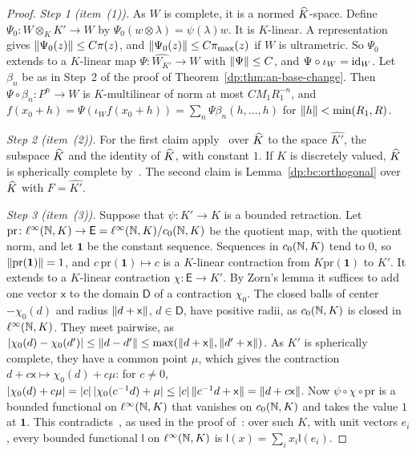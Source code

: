 \begin{proof}
\emph{Step 1 (item~(1)).} As $W$ is complete, it is a normed $\widehat K$-space. Define $\Psi_0\colon W\otimes_KK'\to W$ by $\Psi_0(w\otimes\lambda)=\psi(\lambda)w$. It is $K$-linear. A representation gives $\lVert \Psi_0(z)\rVert\le C\pi(z)$, and $\lVert \Psi_0(z)\rVert\le C\pi_{\max}(z)$ if $W$ is ultrametric. So $\Psi_0$ extends to a $K$-linear map $\Psi\colon\widehat{W_{K'}}\to W$ with $\lVert \Psi\rVert\le C$, and $\Psi\circ\iota_W=\mathrm{id}_W$. Let $\beta_n$ be as in Step~2 of the proof of Theorem~\ref{dp:thm:an-base-change}. Then $\Psi\circ\beta_n\colon P^n\to W$ is $K$-multilinear of norm at most $CM_1R_1^{-n}$, and $f(x_0+h)=\Psi(\iota_Wf(x_0+h))=\sum_n\Psi\beta_n(h,\dots,h)$ for $\lVert h\rVert<\min(R_1,R)$.

\emph{Step 2 (item~(2)).} For the first claim apply~\cite[Theorem~D.3]{I} over $\widehat K$ to the space $\widehat{K'}$, the subspace $\widehat K$ and the identity of $\widehat K$, with constant $1$. If $K$ is discretely valued, $\widehat K$ is spherically complete by~\cite[Lemma~D.1]{I}. The second claim is Lemma~\ref{dp:bc:orthogonal} over $\widehat K$ with $F=\widehat{K'}$.

\emph{Step 3 (item~(3)).} Suppose that $\psi\colon K'\to K$ is a bounded retraction. Let $\mathrm{pr}\colon\ell^\infty(\mathbb N,K)\to\mathsf E=\ell^\infty(\mathbb N,K)/c_0(\mathbb N,K)$ be the quotient map, with the quotient norm, and let $\mathbf 1$ be the constant sequence. Sequences in $c_0(\mathbb N,K)$ tend to $0$, so $\lVert \mathrm{pr}(\mathbf 1)\rVert=1$, and $c\,\mathrm{pr}(\mathbf 1)\mapsto c$ is a $K$-linear contraction from $K\mathrm{pr}(\mathbf 1)$ to $K'$. It extends to a $K$-linear contraction $\chi\colon\mathsf E\to K'$. By Zorn's lemma it suffices to add one vector $\mathsf x$ to the domain $\mathsf D$ of a contraction $\chi_0$. The closed balls of center $-\chi_0(d)$ and radius $\lVert d+\mathsf x\rVert$, $d\in\mathsf D$, have positive radii, as $c_0(\mathbb N,K)$ is closed in $\ell^\infty(\mathbb N,K)$. They meet pairwise, as $\lvert \chi_0(d)-\chi_0(d')\rvert\le\lVert d-d'\rVert\le\max(\lVert d+\mathsf x\rVert,\lVert d'+\mathsf x\rVert)$. As $K'$ is spherically complete, they have a common point $\mu$, which gives the contraction $d+c\mathsf x\mapsto\chi_0(d)+c\mu$: for $c\ne0$, $\lvert \chi_0(d)+c\mu\rvert=\lvert c\rvert\,\lvert \chi_0(c^{-1}d)+\mu\rvert\le\lvert c\rvert\,\lVert c^{-1}d+\mathsf x\rVert=\lVert d+c\mathsf x\rVert$. Now $\psi\circ\chi\circ\mathrm{pr}$ is a bounded functional on $\ell^\infty(\mathbb N,K)$ that vanishes on $c_0(\mathbb N,K)$ and takes the value $1$ at $\mathbf 1$. This contradicts~\cite[Th\'eor\`eme~4.1]{VdP}, as used in the proof of~\cite[Lemma~F.2]{I}: over such $K$, with unit vectors $e_i$, every bounded functional $\mathsf l$ on $\ell^\infty(\mathbb N,K)$ is $\mathsf l(x)=\sum_ix_i\mathsf l(e_i)$.
\end{proof}

